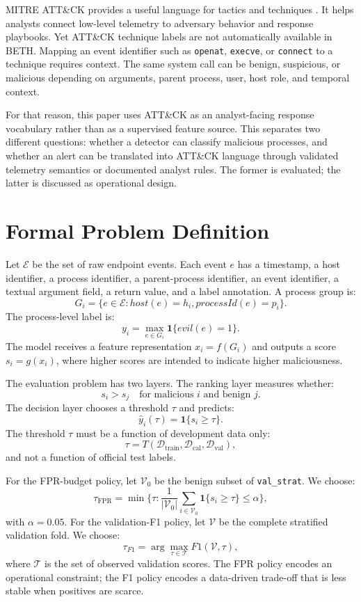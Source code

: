 \documentclass[10pt,journal,compsoc]{IEEEtran}
\begin{document}
MITRE ATT\&CK provides a useful language for tactics and techniques \cite{mitre2023,strom2018}. It helps analysts connect low-level telemetry to adversary behavior and response playbooks. Yet ATT\&CK technique labels are not automatically available in BETH. Mapping an event identifier such as \texttt{openat}, \texttt{execve}, or \texttt{connect} to a technique requires context. The same system call can be benign, suspicious, or malicious depending on arguments, parent process, user, host role, and temporal context.

For that reason, this paper uses ATT\&CK as an analyst-facing response vocabulary rather than as a supervised feature source. This separates two different questions: whether a detector can classify malicious processes, and whether an alert can be translated into ATT\&CK language through validated telemetry semantics or documented analyst rules. The former is evaluated; the latter is discussed as operational design.

\section{Formal Problem Definition}
\label{sec:formal}

Let $\mathcal{E}$ be the set of raw endpoint events. Each event $e$ has a timestamp, a host identifier, a process identifier, a parent-process identifier, an event identifier, a textual argument field, a return value, and a label annotation. A process group is:
\[
G_i = \{e \in \mathcal{E}: host(e)=h_i, processId(e)=p_i\}.
\]
The process-level label is:
\[
y_i = \max_{e\in G_i}\mathbf{1}\{evil(e)=1\}.
\]
The model receives a feature representation $x_i=f(G_i)$ and outputs a score $s_i=g(x_i)$, where higher scores are intended to indicate higher maliciousness.

The evaluation problem has two layers. The ranking layer measures whether:
\[
s_i > s_j \quad \text{for malicious } i \text{ and benign } j.
\]
The decision layer chooses a threshold $\tau$ and predicts:
\[
\hat{y}_i(\tau)=\mathbf{1}\{s_i \geq \tau\}.
\]
The threshold $\tau$ must be a function of development data only:
\[
\tau = T(\mathcal{D}_{\text{train}},\mathcal{D}_{\text{cal}},\mathcal{D}_{\text{val}}),
\]
and not a function of official test labels.

For the FPR-budget policy, let $\mathcal{V}_0$ be the benign subset of \texttt{val\_strat}. We choose:
\[
\tau_{\mathrm{FPR}}=\min\{\tau: \frac{1}{|\mathcal{V}_0|}\sum_{i\in \mathcal{V}_0}\mathbf{1}\{s_i\geq\tau\}\leq \alpha\},
\]
with $\alpha=0.05$. For the validation-F1 policy, let $\mathcal{V}$ be the complete stratified validation fold. We choose:
\[
\tau_{F1}=\arg\max_{\tau \in \mathcal{T}} F1(\mathcal{V},\tau),
\]
where $\mathcal{T}$ is the set of observed validation scores. The FPR policy encodes an operational constraint; the F1 policy encodes a data-driven trade-off that is less stable when positives are scarce.
\end{document}
